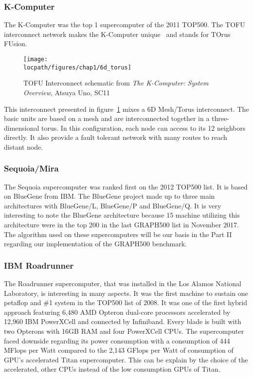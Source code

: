 \subsubsection{K-Computer}
The K-Computer was the top 1 supercomputer of the 2011 TOP500. 
The TOFU interconnect network makes the K-Computer unique~\cite{ajima2009tofu} and stands for TOrus FUsion.
\begin{figure}[t!]
\begin{center}
\texttt{[image: \\locpath/figures/chap1/6d\_torus]}
\end{center}
\caption[The TOFU Interconnect]{TOFU Interconnect schematic from \textit{The K-Computer: System Overview}, Atsuya Uno, SC11}
\label{fig:1_HPC:tofu}
\end{figure}
This interconnect presented in figure~\ref{fig:1_HPC:tofu} mixes a 6D Mesh/Torus interconnect.
The basic units are based on a mesh and are interconnected together in a three-dimensional torus. 
In this configuration, each node can access to its 12 neighbors directly. 
It also provide a fault tolerant network with many routes to reach distant node. 

\subsubsection{Sequoia/Mira}
The Sequoia supercomputer was ranked first on the 2012 TOP500 list. 
It is based on BlueGene from IBM.
The BlueGene project made up to three main architectures with BlueGene/L, BlueGene/P and BlueGene/Q.
It is very interesting to note the BlueGene architecture because 15 machine utilizing this architecture were in the top 200 in the last GRAPH500 list in November 2017.
The algorithm used on these supercomputers will be our basis in the Part II regarding our implementation of the GRAPH500 benchmark.

\subsubsection{IBM Roadrunner}
The Roadrunner supercomputer, that was installed in the Los Alamos National Laboratory, is interesting in many aspects. 
It was the first machine to sustain one petaflop and \#1 system in the TOP500 list of 2008. 
It was one of the first hybrid approach featuring 6,480 AMD Opteron dual-core processors accelerated by 12,960 IBM PowerXCell and connected by Infiniband. 
Every blade is built with two Opterons with 16GB RAM and four PowerXCell CPUs. 
The supercomputer faced downside regarding its power consumption with a consumption of 444 MFlops per Watt compared to the 2,143 GFlops per Watt of consumption of GPU's accelerated Titan supercomputer.
This can be explain by the choice of the accelerated, other CPUs instead of the low consumption GPUs of Titan.

